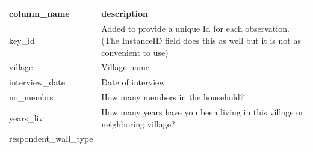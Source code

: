 \documentclass[]{book}
\begin{document}
\begin{longtable}[]{@{}ll@{}}
\toprule
\begin{minipage}[b]{0.16\columnwidth}\raggedright\strut
column\_name\strut
\end{minipage} & \begin{minipage}[b]{0.16\columnwidth}\raggedright\strut
description\strut
\end{minipage}\tabularnewline
\midrule
\endhead
\begin{minipage}[t]{0.16\columnwidth}\raggedright\strut
key\_id\strut
\end{minipage} & \begin{minipage}[t]{0.16\columnwidth}\raggedright\strut
Added to provide a unique Id for each observation. (The InstanceID field
does this as well but it is not as convenient to use)\strut
\end{minipage}\tabularnewline
\begin{minipage}[t]{0.16\columnwidth}\raggedright\strut
village\strut
\end{minipage} & \begin{minipage}[t]{0.16\columnwidth}\raggedright\strut
Village name\strut
\end{minipage}\tabularnewline
\begin{minipage}[t]{0.16\columnwidth}\raggedright\strut
interview\_date\strut
\end{minipage} & \begin{minipage}[t]{0.16\columnwidth}\raggedright\strut
Date of interview\strut
\end{minipage}\tabularnewline
\begin{minipage}[t]{0.16\columnwidth}\raggedright\strut
no\_membrs\strut
\end{minipage} & \begin{minipage}[t]{0.16\columnwidth}\raggedright\strut
How many members in the household?\strut
\end{minipage}\tabularnewline
\begin{minipage}[t]{0.16\columnwidth}\raggedright\strut
years\_liv\strut
\end{minipage} & \begin{minipage}[t]{0.16\columnwidth}\raggedright\strut
How many years have you been living in this village or neighboring
village?\strut
\end{minipage}\tabularnewline
\begin{minipage}[t]{0.16\columnwidth}\raggedright\strut
respondent\_wall\_type\strut
\end{minipage} & \begin{minipage}[t]{0.16\columnwidth}\raggedright\strut

\end{minipage}
\end{longtable}
\end{document}
